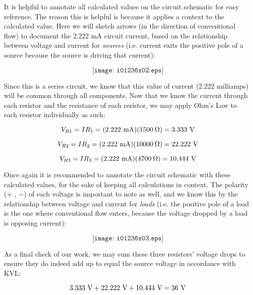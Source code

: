 It is helpful to annotate all calculated values on the circuit schematic for easy reference.  The reason this is helpful is because it applies a context to the calculated value.  Here we will sketch arrows (in the direction of conventional flow) to document the 2.222 mA circuit current, based on the relationship between voltage and current for {\it sources} (i.e. current exits the positive pole of a source because the source is driving that current):

$$\texttt{[image: i01236x02.eps]}$$

Since this is a series circuit, we know that this value of current (2.222 milliamps) will be common through all components.  Now that we know the current through each resistor and the resistance of each resistor, we may apply Ohm's Law to each resistor individually as such:

$$V_{R1} = I R_1 = (2.222 \hbox{ mA}) (1500 \> \Omega) = 3.333 \hbox{ V}$$

$$V_{R2} = I R_2 = (2.222 \hbox{ mA}) (10000 \> \Omega) = 22.222 \hbox{ V}$$

$$V_{R3} = I R_3 = (2.222 \hbox{ mA}) (4700 \> \Omega) = 10.444 \hbox{ V}$$

\filbreak

Once again it is recommended to annotate the circuit schematic with these calculated values, for the sake of keeping all calculations in context.  The polarity (+ , $-$) of each voltage is important to note as well, and we know this by the relationship between voltage and current for {\it loads} (i.e. the positive pole of a load is the one where conventional flow enters, because the voltage dropped by a load is opposing current):

$$\texttt{[image: i01236x03.eps]}$$

As a final check of our work, we may sum these three resistors' voltage drops to ensure they do indeed add up to equal the source voltage in accordance with KVL:

$$ 3.333 \hbox{ V} + 22.222 \hbox{ V} + 10.444 \hbox{ V} = 36 \hbox{ V}$$
 










